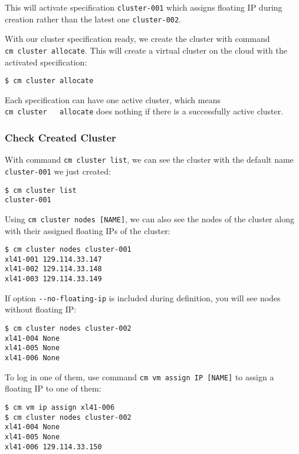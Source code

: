 This will activate specification \texttt{cluster-001} which assigns
floating IP during creation rather than the latest one
\texttt{cluster-002}.

With our cluster specification ready, we create the cluster with command
\texttt{cm\ cluster\ allocate}. This will create a virtual cluster on
the cloud with the activated specification:

\begin{verbatim}
$ cm cluster allocate
\end{verbatim}

Each specification can have one active cluster, which means
\texttt{cm\ cluster\ \ \ allocate} does nothing if there is a
successfully active cluster.

\subsubsection{Check Created Cluster}\label{check-created-cluster}

With command \texttt{cm\ cluster\ list}, we can see the cluster with the
default name \texttt{cluster-001} we just created:

\begin{verbatim}
$ cm cluster list
cluster-001
\end{verbatim}

Using \texttt{cm\ cluster\ nodes\ {[}NAME{]}}, we can also see the nodes
of the cluster along with their assigned floating IPs of the cluster:

\begin{verbatim}
$ cm cluster nodes cluster-001
xl41-001 129.114.33.147
xl41-002 129.114.33.148
xl41-003 129.114.33.149
\end{verbatim}

If option \texttt{-\/-no-floating-ip} is included during definition, you
will see nodes without floating IP:

\begin{verbatim}
$ cm cluster nodes cluster-002
xl41-004 None
xl41-005 None
xl41-006 None
\end{verbatim}

To log in one of them, use command
\texttt{cm\ vm\ assign\ IP\ {[}NAME{]}} to assign a floating IP to one
of them:

\begin{verbatim}
$ cm vm ip assign xl41-006
$ cm cluster nodes cluster-002
xl41-004 None
xl41-005 None
xl41-006 129.114.33.150
\end{verbatim}

